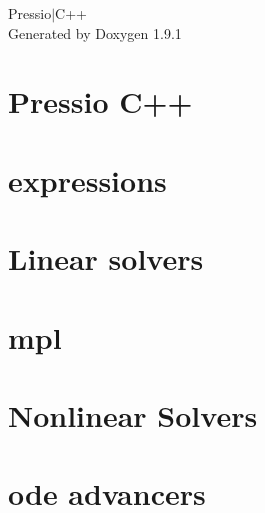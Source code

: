 \let\mypdfximage\pdfximage\def\pdfximage{\immediate\mypdfximage}\documentclass[twoside]{book}
\newcommand{\+}{\discretionary{\mbox{\scriptsize$\hookleftarrow$}}{}{}}
\newcommand{\clearemptydoublepage}{%
  \newpage{\pagestyle{empty}\cleardoublepage}%
}
\begin{document}
\raggedbottom

\hypersetup{pageanchor=false,
             bookmarksnumbered=true,
             pdfencoding=unicode
            }
\begin{titlepage}
\vspace*{7cm}
\begin{center}%
{\Large Pressio$\vert$\+C++ }\\
\vspace*{1cm}
{\large Generated by Doxygen 1.9.1}\\
\end{center}
\end{titlepage}
\clearemptydoublepage
{}
\tableofcontents
\clearemptydoublepage
{}
\hypersetup{pageanchor=true}

\chapter{Pressio C++}
\label{index}\hypertarget{index}{}
\chapter{expressions}
\label{md_pages_components_expressions}

\chapter{Linear solvers}
\label{md_pages_components_linsolvers}

\chapter{mpl}
\label{md_pages_components_mpl}

\chapter{Nonlinear Solvers}
\label{md_pages_components_nonlinsolvers}

\chapter{ode advancers}
\label{md_pages_components_ode_advance}

\end{document}
